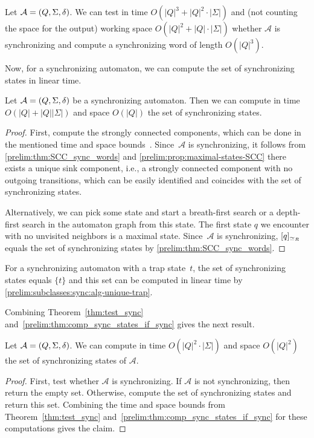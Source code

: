 \begin{theorem}
	\label{prelim:thm:compute_sync_word}
	Let $\mathcal A = (Q, \Sigma, \delta)$.
	We can test in time $O(|Q|^3 + |Q|^2 \cdot |\Sigma|)$
	and (not counting the space for the output)
	working space $O(|Q|^2 + |Q| \cdot |\Sigma|)$ whether $\mathcal A$
	is synchronizing and compute a synchronizing word of length $O(|Q|^3)$.
\end{theorem}

Now, for a synchronizing automaton, we can compute the set of synchronizing states in linear time. %

\begin{theorem}
	\label{prelim:thm:comp_sync_states_if_sync}
	Let $\mathcal A = (Q, \Sigma, \delta)$
	be a synchronizing automaton.
	Then we can compute in time $O(|Q| + |Q||\Sigma|)$ and space $O(|Q|)$
	the set of synchronizing states.	
\end{theorem}
\begin{proof}
	First, compute the strongly connected
	components, which can be done
	in the mentioned time and space bounds~\cite{cormen01introduction,DBLP:journals/siamcomp/Tarjan72}.
	Since~$\mathcal A$ is synchronizing,
	it follows from \cref{prelim:thm:SCC_sync_words} and \cref{prelim:prop:maximal-states-SCC}
	there exists
	a unique sink component, i.e., a strongly connected component
	with no outgoing transitions, 
	which can be easily identified and coincides with the set of synchronizing states.
	
	Alternatively, we can pick some state and start a breath-first search or a depth-first search
	in the automaton graph from this state.
	The first state $q$ we encounter with no unvisited 
	neighbors is a maximal state.
	Since~$\mathcal A$
	is synchronizing, $[q]_{\simeq_R}$
	equals the set of synchronizing states
	by \cref{prelim:thm:SCC_sync_words}.
\end{proof}

For a synchronizing automaton with a trap state~$t$,
the set of synchronizing states equals $\{t\}$
and this set can be computed in linear time 
by \cref{prelim:subclasses:sync:alg-unique-trap}.

Combining Theorem~\ref{thm:test_sync} 
and~\ref{prelim:thm:comp_sync_states_if_sync}
gives the next result.

\begin{corollary}
	\label{prelim:cor:set_sync_words_in_P}
	Let $\mathcal A = (Q, \Sigma, \delta)$.
	We can compute in time 
	$
	O\left( |Q|^2 \cdot |\Sigma|\right)
	$
	and space $O\left(|Q|^2\right)$	
	the set of synchronizing states of $\mathcal A$.
\end{corollary}
\begin{proof}
	First, test whether $\mathcal A$ is synchronizing.
	If $\mathcal A$ is not synchronizing, then return the empty set.
	Otherwise, compute the set of synchronizing states and return
	this set. Combining the time and space bounds from Theorem~\ref{thm:test_sync} 
	and~\ref{prelim:thm:comp_sync_states_if_sync}
	for these computations gives the claim.
\end{proof}